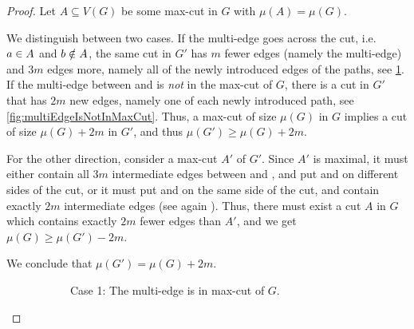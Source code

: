 \documentclass[a4paper,UKenglish,cleveref, thm-restate]{lipics-v2021}
\begin{document}
\begin{proof}
Let $A \subseteq V(G)$ be some max-cut in $G$ with $\mu(A) = \mu(G).$


We distinguish between two cases.
If the multi-edge goes across the cut, i.e. $\nodeA \in A$ and $\nodeB \notin A$,
the same cut in $G'$ has $m$ fewer edges (namely the multi-edge) and $3m$ edges more, namely all of the newly introduced edges of the paths, see \cref{fig:multiEdgeIsInMaxCut}.
If the multi-edge between \nodeA and \nodeB is \emph{not} in the max-cut of $G$, there is a cut in $G'$ that has $2m$ new edges, namely one of each newly introduced path, see \cref{fig:multiEdgeIsNotInMaxCut}.
Thus, a max-cut of size $\mu(G)$ in $G$ implies a cut of size $\mu(G) + 2m$ in $G'$, and thus $\mu(G')\geq \mu(G)+2m$. 

For the other direction, consider a max-cut $A'$ of $G'$. Since $A'$ is maximal, it must either contain all $3m$ intermediate edges between \nodeA and \nodeB, and put \nodeA and \nodeB on different sides of the cut, or it must put \nodeA and \nodeB on the same side of the cut, and contain exactly $2m$ intermediate edges (see again ). Thus, there must exist a cut $A$ in $G$ which contains exactly $2m$ fewer edges than $A'$, and we get $\mu(G)\geq \mu(G')-2m$.

We conclude that $\mu(G')=\mu(G)+2m$.
\begin{figure}[h!]
\begin{subfigure}[b]{0.5\textwidth}
\centering
{}
\caption{Case 1: The multi-edge is in max-cut of $G$.}
\label{fig:multiEdgeIsInMaxCut}
\end{subfigure}
\begin{subfigure}[b]{0.5\textwidth}
\centering
{}
\end{subfigure}
\end{figure}
\end{proof}
\end{document}

